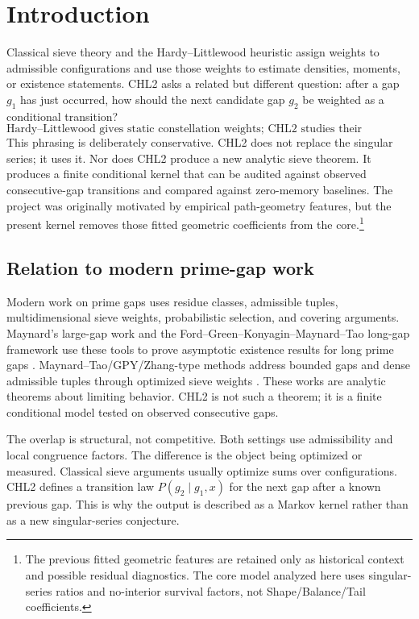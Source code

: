 \documentclass[10pt]{article}
\begin{document}
\section{Introduction}
Classical sieve theory and the Hardy--Littlewood heuristic assign weights to admissible configurations and use those weights to estimate densities, moments, or existence statements. CHL2 asks a related but different question: after a gap $g_1$ has just occurred, how should the next candidate gap $g_2$ be weighted as a conditional transition?
\[
\boxed{\text{Hardy--Littlewood gives static constellation weights; CHL2 studies their conditional Markov factorization.}}
\]
This phrasing is deliberately conservative. CHL2 does not replace the singular series; it uses it. Nor does CHL2 produce a new analytic sieve theorem. It produces a finite conditional kernel that can be audited against observed consecutive-gap transitions and compared against zero-memory baselines. The project was originally motivated by empirical path-geometry features, but the present kernel removes those fitted geometric coefficients from the core.\footnote{The previous fitted geometric features are retained only as historical context and possible residual diagnostics. The core model analyzed here uses singular-series ratios and no-interior survival factors, not Shape/Balance/Tail coefficients.}
\subsection{Relation to modern prime-gap work}
Modern work on prime gaps uses residue classes, admissible tuples, multidimensional sieve weights, probabilistic selection, and covering arguments. Maynard's large-gap work and the Ford--Green--Konyagin--Maynard--Tao long-gap framework use these tools to prove asymptotic existence results for long prime gaps \cite{maynard-large,ford2016}. Maynard--Tao/GPY/Zhang-type methods address bounded gaps and dense admissible tuples through optimized sieve weights \cite{gpy,maynard-small,zhang}. These works are analytic theorems about limiting behavior. CHL2 is not such a theorem; it is a finite conditional model tested on observed consecutive gaps.

The overlap is structural, not competitive. Both settings use admissibility and local congruence factors. The difference is the object being optimized or measured. Classical sieve arguments usually optimize sums over configurations. CHL2 defines a transition law $P(g_2\mid g_1,x)$ for the next gap after a known previous gap. This is why the output is described as a Markov kernel rather than as a new singular-series conjecture.
\end{document}
